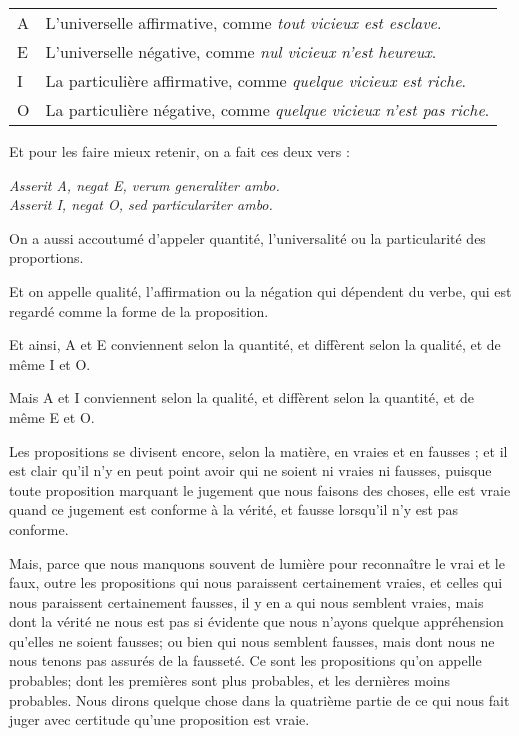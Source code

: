 \begin{table}[!htbp]
	\centering\begin{tabularx}{\textwidth}{lX}
	    A & L'universelle affirmative, comme \emph{tout vicieux est esclave}. \\
	    E & L'universelle négative, comme \emph{nul vicieux n'est heureux}. \\
	    I & La particulière affirmative, comme \emph{quelque vicieux est riche}. \\
	    O & La particulière négative, comme \emph{quelque vicieux n'est pas riche}. \\
    \end{tabularx}
\end{table}

Et pour les faire mieux retenir, on a fait ces deux vers :

\begin{center}
	\emph{Asserit A, negat E, verum generaliter ambo.}
	\\\emph{Asserit I, negat O, sed particulariter ambo.}
\end{center}

On a aussi accoutumé d'appeler quantité, l'universalité ou la particularité des proportions.

Et on appelle qualité, l'affirmation ou la négation qui dépendent du verbe, qui est regardé comme la forme de la proposition.

Et ainsi, A et E conviennent selon la quantité, et diffèrent selon la qualité, et de même I et O.

Mais A et I conviennent selon la qualité, et diffèrent selon la quantité, et de même E et O.

Les propositions se divisent encore, selon la matière, en vraies et en fausses ; et il est clair qu'il n'y en peut point avoir qui ne soient ni vraies ni fausses, puisque toute proposition marquant le jugement que nous faisons des choses, elle est vraie quand ce jugement est conforme à la vérité, et fausse lorsqu'il n'y est pas conforme.

Mais, parce que nous manquons souvent de lumière pour reconnaître le vrai et le faux, outre les propositions qui nous paraissent certainement vraies, et celles qui nous paraissent certainement fausses, il y en a qui nous semblent vraies, mais dont la vérité ne nous est pas si évidente que nous n'ayons quelque appréhension qu'elles ne soient fausses; ou bien qui nous semblent fausses, mais dont nous ne nous tenons pas assurés de la fausseté. Ce sont les propositions qu'on appelle probables; dont les premières sont plus probables, et les dernières moins probables. Nous dirons quelque chose dans la quatrième partie de ce qui nous fait juger avec certitude qu'une proposition est vraie.
